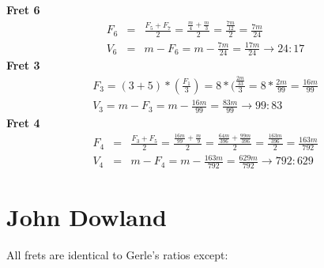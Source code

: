 \textbf{Fret 6}
\begin{eqnarray*}
    F_{6}
        &=& \frac{F_{5} + F_{7}}{2}
        = \frac{\frac{m}{4} + \frac{m}{3}}{2}
        = \frac{\frac{7m}{12}}{2}
        = \frac{7m}{24} \\
    V_{6}
        &=& m - F_{6}
        = m - \frac{7m}{24}
        = \frac{17m}{24}
        \to 24:17
\end{eqnarray*}
\textbf{Fret 3}
\begin{eqnarray*}
F_{3} =
    (3 + 5) * (\frac{F_{1}}{3}) =
    8 * (\frac{\frac{2m}{33}}{3} =
    8 * \frac{2m}{99} =
    \frac{16m}{99} \\
V_{3} =
    m - F_{3} =
    m - \frac{16m}{99} = \frac{83m}{99}
    \to 99:83
\end{eqnarray*}
\textbf{Fret 4}
\begin{eqnarray*}
    F_{4}
        &=& \frac{F_{3} + F_{5}}{2}
        = \frac{\frac{16m}{99} + \frac{m}{9}}{2}
        = \frac{\frac{64m}{396} + \frac{99m}{396}}{2}
        = \frac{\frac{163m}{396}}{2}
        = \frac{163m}{792} \\
    V_{4}
        &=& m - F_{4}
        = m - \frac{163m}{792}
        = \frac{629m}{792}
        \to 792:629
\end{eqnarray*}

\section{John Dowland}
All frets are identical to Gerle's ratios except:

